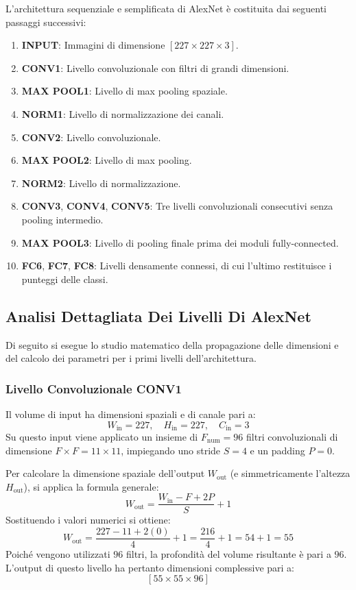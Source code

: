 ﻿\documentclass[11pt, a4paper]{article}
\begin{document}
L'architettura sequenziale e semplificata di AlexNet è costituita dai seguenti passaggi successivi:
\begin{enumerate}
    \item \textbf{INPUT}: Immagini di dimensione $[227 \times 227 \times 3]$.
    \item \textbf{CONV1}: Livello convoluzionale con filtri di grandi dimensioni.
    \item \textbf{MAX POOL1}: Livello di max pooling spaziale.
    \item \textbf{NORM1}: Livello di normalizzazione dei canali.
    \item \textbf{CONV2}: Livello convoluzionale.
    \item \textbf{MAX POOL2}: Livello di max pooling.
    \item \textbf{NORM2}: Livello di normalizzazione.
    \item \textbf{CONV3}, \textbf{CONV4}, \textbf{CONV5}: Tre livelli convoluzionali consecutivi senza pooling intermedio.
    \item \textbf{MAX POOL3}: Livello di pooling finale prima dei moduli fully-connected.
    \item \textbf{FC6}, \textbf{FC7}, \textbf{FC8}: Livelli densamente connessi, di cui l'ultimo restituisce i punteggi delle classi.
\end{enumerate}

\subsection{Analisi Dettagliata Dei Livelli Di AlexNet}

Di seguito si esegue lo studio matematico della propagazione delle dimensioni e del calcolo dei parametri per i primi livelli dell'architettura.

\subsubsection{Livello Convoluzionale CONV1}

Il volume di input ha dimensioni spaziali e di canale pari a:
\[
W_{\text{in}} = 227, \quad H_{\text{in}} = 227, \quad C_{\text{in}} = 3
\]
Su questo input viene applicato un insieme di $F_{\text{num}} = 96$ filtri convoluzionali di dimensione $F \times F = 11 \times 11$, impiegando uno stride $S = 4$ e un padding $P = 0$.

Per calcolare la dimensione spaziale dell'output $W_{\text{out}}$ (e simmetricamente l'altezza $H_{\text{out}}$), si applica la formula generale:
\[
W_{\text{out}} = \frac{W_{\text{in}} - F + 2P}{S} + 1
\]
Sostituendo i valori numerici si ottiene:
\[
W_{\text{out}} = \frac{227 - 11 + 2(0)}{4} + 1 = \frac{216}{4} + 1 = 54 + 1 = 55
\]
Poiché vengono utilizzati $96$ filtri, la profondità del volume risultante è pari a $96$. L'output di questo livello ha pertanto dimensioni complessive pari a:
\[
\boxed{[55 \times 55 \times 96]}
\]
\end{document}
